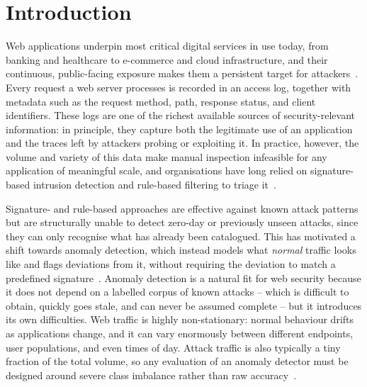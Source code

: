 \documentclass[futureinternet,article,submit,moreauthors]{Definitions/mdpi}
\begin{document}
\section{Introduction} \label{sec1}

Web applications underpin most critical digital services in use today, from banking and healthcare to e-commerce and cloud infrastructure, and their continuous, public-facing exposure makes them a persistent target for attackers~\cite{scarfone2007}. Every request a web server processes is recorded in an access log, together with metadata such as the request method, path, response status, and client identifiers. These logs are one of the richest available sources of security-relevant information: in principle, they capture both the legitimate use of an application and the traces left by attackers probing or exploiting it. In practice, however, the volume and variety of this data make manual inspection infeasible for any application of meaningful scale, and organisations have long relied on signature-based intrusion detection and rule-based filtering to triage it~\cite{scarfone2007}.

Signature- and rule-based approaches are effective against known attack patterns but are structurally unable to detect zero-day or previously unseen attacks, since they can only recognise what has already been catalogued. This has motivated a shift towards anomaly detection, which instead models what \emph{normal} traffic looks like and flags deviations from it, without requiring the deviation to match a predefined signature~\cite{chandola2009}. Anomaly detection is a natural fit for web security because it does not depend on a labelled corpus of known attacks -- which is difficult to obtain, quickly goes stale, and can never be assumed complete -- but it introduces its own difficulties. Web traffic is highly non-stationary: normal behaviour drifts as applications change, and it can vary enormously between different endpoints, user populations, and even times of day. Attack traffic is also typically a tiny fraction of the total volume, so any evaluation of an anomaly detector must be designed around severe class imbalance rather than raw accuracy~\cite{chandola2009}.
\end{document}
